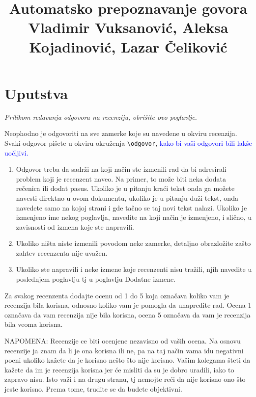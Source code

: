 \documentclass[a4paper]{report}
\newcommand{\odgovor}[1]{\textcolor{blue}{#1}}
\begin{document}
\title{Automatsko prepoznavanje govora\\ \small{Vladimir Vuksanović, Aleksa Kojadinović, Lazar Čeliković}}

\maketitle

\tableofcontents

\chapter{Uputstva}
\emph{Prilikom redavanja odgovora na recenziju, obrišite ovo poglavlje.}

Neophodno je odgovoriti na sve zamerke koje su navedene u okviru recenzija. Svaki odgovor pišete u okviru okruženja \verb"\odgovor", \odgovor{kako bi vaši odgovori bili lakše uočljivi.} 
\begin{enumerate}

\item Odgovor treba da sadrži na koji način ste izmenili rad da bi adresirali problem koji je recenzent naveo. Na primer, to može biti neka dodata rečenica ili dodat pasus. Ukoliko je u pitanju kraći tekst onda ga možete navesti direktno u ovom dokumentu, ukoliko je u pitanju duži tekst, onda navedete samo na kojoj strani i gde tačno se taj novi tekst nalazi. Ukoliko je izmenjeno ime nekog poglavlja, navedite na koji način je izmenjeno, i slično, u zavisnosti od izmena koje ste napravili. 

\item Ukoliko ništa niste izmenili povodom neke zamerke, detaljno obrazložite zašto zahtev recenzenta nije uvažen.

\item Ukoliko ste napravili i neke izmene koje recenzenti nisu tražili, njih navedite u poslednjem poglavlju tj u poglavlju Dodatne izmene.
\end{enumerate}

Za svakog recenzenta dodajte ocenu od 1 do 5 koja označava koliko vam je recenzija bila korisna, odnosno koliko vam je pomogla da unapredite rad. Ocena 1 označava da vam recenzija nije bila korisna, ocena 5 označava da vam je recenzija bila veoma korisna. 

NAPOMENA: Recenzije ce biti ocenjene nezavisno od vaših ocena. Na osnovu recenzije ja znam da li je ona korisna ili ne, pa na taj način vama idu negativni poeni ukoliko kažete da je korisno nešto što nije korisno. Vašim kolegama šteti da kažete da im je recenzija korisna jer će misliti da su je dobro uradili, iako to zapravo nisu. Isto važi i na drugu stranu, tj nemojte reći da nije korisno ono što jeste korisno. Prema tome, trudite se da budete objektivni. 
\end{document}
